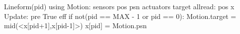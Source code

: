 Lineform(pid)
   using Motion:
      sensors pos psn
      actuators target
   allread: pos x $\label{lineformp}$
   Update:
      pre True
      eff if not(pid == MAX - 1 or pid == 0):
         Motion.target = mid(<x[pid+1],x[pid-1]>)
         x[pid] = Motion.psn

